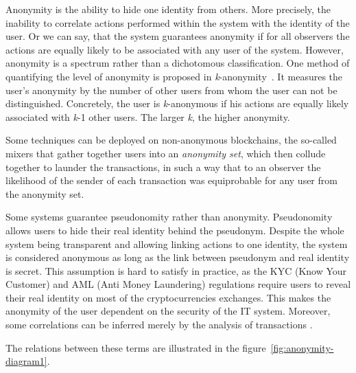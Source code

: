 \documentclass{ieeeaccess}
\begin{document}
Anonymity is the ability to hide one identity from others. More precisely, the inability to correlate actions performed within the system with the identity of the user. Or we can say, that the system guarantees anonymity if for all observers the actions are equally likely to be associated with any user of the system. However, anonymity is a spectrum rather than a dichotomous classification. One method of quantifying the level of anonymity is proposed in \textit{k}-anonymity~\cite{sweeney2002k}. It measures the user's anonymity by the number of other users from whom the user can not be distinguished. Concretely, the user is \textit{k}-anonymous if his actions are equally likely associated with \textit{k}-1 other users. The larger \textit{k}, the higher anonymity.

Some techniques can be deployed on non-anonymous blockchains, the so-called mixers that gather together users into an \textit{anonymity set}, which then collude together to launder the transactions, in such a way that to an observer the likelihood of the sender of each transaction was equiprobable for any user from the anonymity set.

Some systems guarantee pseudonomity rather than anonymity. Pseudonomity allows users to hide their real identity behind the pseudonym. Despite the whole system being transparent and allowing linking actions to one identity, the system is considered anonymous as long as the link between pseudonym and real identity is secret. This assumption is hard to satisfy in practice, as the KYC (Know Your Customer) and AML (Anti Money Laundering) regulations require users to reveal their real identity on most of the cryptocurrencies exchanges. This makes the anonymity of the user dependent on the security of the IT system. Moreover, some correlations can be inferred merely by the analysis of transactions \cite{androulaki2013evaluating, ober2013structure}.

The relations between these terms are illustrated in the figure~\ref{fig:anonymity-diagram1}.
\end{document}
